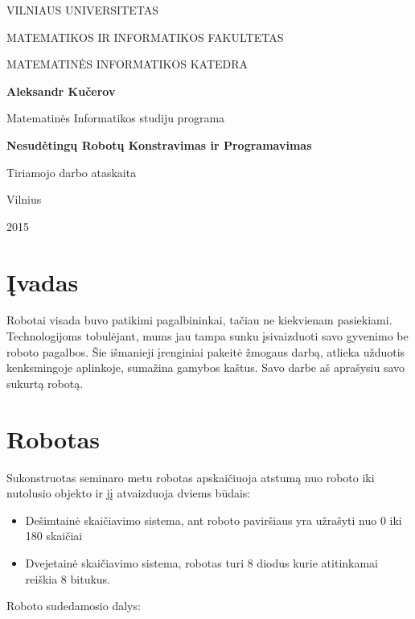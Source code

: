 \documentclass[a4paper, 12pt]{article}
\begin{document}
\thispagestyle {empty}

\begin{center}

VILNIAUS UNIVERSITETAS

MATEMATIKOS IR INFORMATIKOS FAKULTETAS

MATEMATINĖS INFORMATIKOS KATEDRA

\vspace{40mm}

\textbf{Aleksandr Kučerov}

Matematinės Informatikos studiju programa

\vspace{30mm}

\textbf{\huge Nesudėtingų Robotų Konstravimas ir Programavimas}

Tiriamojo darbo ataskaita

\vspace{70mm}
\vfill

Vilnius

2015

\end{center}

\clearpage
\newpage
\tableofcontents

\newpage
\section*{Įvadas}
Robotai visada buvo patikimi pagalbininkai, tačiau ne kiekvienam pasiekiami. Technologijoms tobulėjant, mums jau tampa sunku įsivaizduoti savo gyvenimo be roboto pagalbos. Šie išmanieji įrenginiai pakeitė žmogaus darbą, atlieka užduotis kenksmingoje aplinkoje, sumažina gamybos kaštus. 
Savo darbe aš aprašysiu savo sukurtą robotą.

\newpage
\section{Robotas}
Sukonstruotas seminaro metu robotas apskaičiuoja atstumą nuo roboto iki nutolusio objekto ir jį atvaizduoja dviems būdais:
\begin{itemize}
    \item Dešimtainė skaičiavimo sistema, ant roboto paviršiaus yra užrašyti nuo 0 iki 180 skaičiai
    \item Dvejetainė skaičiavimo sistema, robotas turi 8 diodus kurie atitinkamai reiškia 8 bitukus.
\end{itemize}
Roboto sudedamosio dalys:
\end{document}
